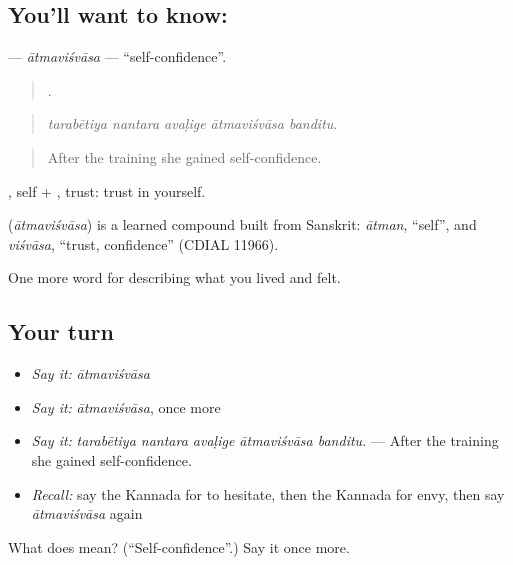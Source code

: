 \subsection*{You'll want to know: }
\textbf{} — \emph{ātmaviśvāsa} — \textquotedblleft{}self-confidence\textquotedblright{}.

\begin{quote}
    .
\end{quote}

\begin{quote}
\emph{tarabētiya nantara avaḷige ātmaviśvāsa banditu.}
\end{quote}

\begin{quote}
After the training she gained self-confidence.
\end{quote}

, self + , trust: trust in yourself.

\begin{cousinweb}
\textbf{} (\emph{ātmaviśvāsa}) is a learned compound built from Sanskrit: \emph{ātman}, \textquotedblleft{}self\textquotedblright{}, and \emph{viśvāsa}, \textquotedblleft{}trust, confidence\textquotedblright{} (CDIAL 11966).
\end{cousinweb}

\begin{grammarlens}[title={What you've built}]
One more word for describing what you lived and felt.
\end{grammarlens}

\subsection*{Your turn}
\begin{itemize}
\raggedright
  \item \emph{Say it:} \emph{ātmaviśvāsa}
  \item \emph{Say it:} \emph{ātmaviśvāsa}, once more
  \item \emph{Say it:} \emph{tarabētiya nantara avaḷige ātmaviśvāsa banditu.} — After the training she gained self-confidence.
  \item \emph{Recall:} say the Kannada for to hesitate, then the Kannada for envy, then say \emph{ātmaviśvāsa} again
\end{itemize}

\begin{tcolorbox}[breakable,colback=teal!4,colframe=teal!35!black,title={Before you move on}]
What does  mean? (\textquotedblleft{}Self-confidence\textquotedblright{}.) Say it once more.
\end{tcolorbox}
